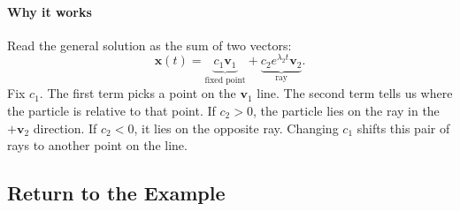 \documentclass[10pt,letterpaper]{article}
\begin{document}
\paragraph{Why it works}
Read the general solution as the sum of two vectors:
\[
    \mathbf{x}(t)
    =\underbrace{c_1\mathbf{v}_1}_{\text{fixed point}}
     +\underbrace{c_2e^{\lambda_2t}\mathbf{v}_2}_{\text{ray}}.
\]
Fix $c_1$. The first term picks a point on the $\mathbf{v}_1$ line.
The second term tells us where the particle is relative to that point.
If $c_2>0$, the particle lies on the ray in the $+\mathbf{v}_2$
direction. If $c_2<0$, it lies on the opposite ray. Changing $c_1$
shifts this pair of rays to another point on the line.

\subsection{Return to the Example}
\end{document}
